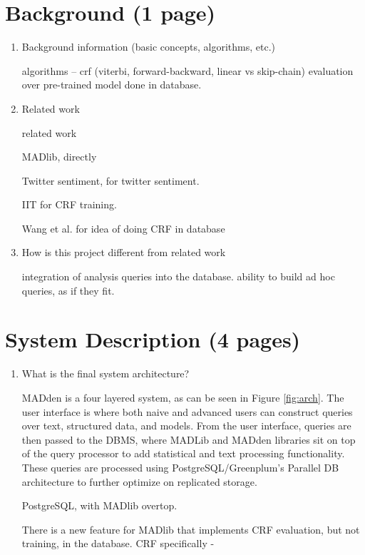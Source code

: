 \documentclass{article}
\newcommand{\system}{MADden\xspace}
\begin{document}
\begin{enumerate}
  \section{Background (1 page)}
  \begin{enumerate}
  \item Background information (basic concepts, algorithms, etc.)


    algorithms -- crf (viterbi, forward-backward, linear vs skip-chain) evaluation over pre-trained model done in database.



  \item Related work

    related work

    MADlib, directly

    Twitter sentiment, for twitter sentiment.

    IIT for CRF training.

    Wang et al. for idea of doing CRF in database

  \item How is this project different from related work

    integration of analysis queries into the database. ability to build ad hoc queries, as if they fit.
  \end{enumerate}

  \section{System Description (4 pages)}
  \begin{enumerate}
  \item What is the final system architecture?

    {\system} is a four layered system, as can be seen in Figure \ref{fig:arch}.
    The user interface is where both naive and advanced users can construct queries over text, structured data, and models.
    From the user interface,
    queries are then passed to the DBMS,
    where MADLib and {\system} libraries sit on top of the query processor to add statistical and text processing functionality.
    These queries are processed using PostgreSQL/Greenplum's Parallel DB architecture to further optimize on replicated storage.


    PostgreSQL, with MADlib overtop.

    There is a new feature for MADlib that implements CRF evaluation, but not training, in the database.
    CRF specifically -


\end{enumerate}
\end{enumerate}
\end{document}
